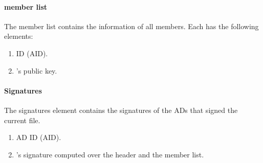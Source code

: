 \paragraph{\TDC member list}
The \TDC member list contains the information of all \TDC members. Each \AD has the following elements:
\begin{enumerate}
\item \AD ID (AID).
\item \AD's public key.
\end{enumerate}

\paragraph{Signatures}
The signatures element contains the signatures of the \TDC ADs that signed the current \RT file.
\begin{enumerate}
\item AD ID (AID).
\item \AD's signature computed over the header and the \TDC member list.
\end{enumerate}


